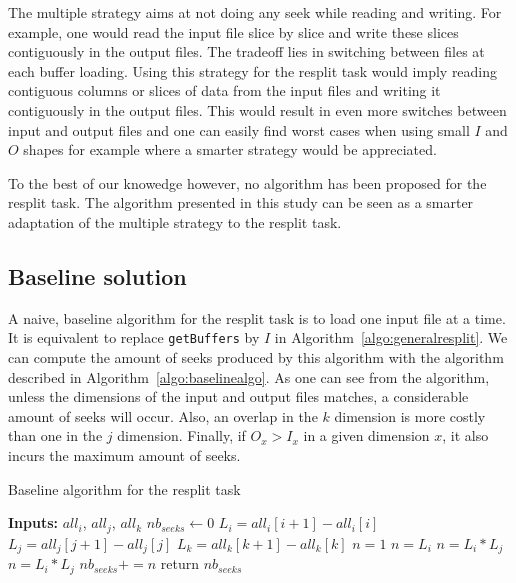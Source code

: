 \documentclass[conference]{IEEEtran}
\begin{document}
The multiple strategy aims at not doing any seek while reading and writing. For
example, one would read the input file slice by slice and write these slices
contiguously in the output files. The tradeoff lies in switching between files
at each buffer loading. Using this strategy for the resplit task would imply
reading contiguous columns or slices of data from the input files and writing it
contiguously in the output files. This would result in even more switches
between input and output files and one can easily find worst cases when using
small $I$ and $O$ shapes for example where a smarter strategy would be appreciated.

To the best of our knowedge however, no algorithm has been proposed for the
resplit task. The algorithm presented in this study can be seen as a smarter
adaptation of the multiple strategy to the resplit task.

\subsection{Baseline solution}
A naive, baseline algorithm for the resplit task is to load one input file at a
time. It is equivalent to replace \texttt{getBuffers} by $I$ in
Algorithm~\ref{algo:generalresplit}. We can compute the amount of seeks produced
by this algorithm with the algorithm described in Algorithm~\ref{algo:baselinealgo}.
As one can see from the algorithm, unless the dimensions of the input and output
files matches, a considerable amount of seeks will occur. Also, an overlap in the
$k$ dimension is more costly than one in the $j$ dimension. Finally, if
$O_x>I_x$ in a given dimension $x$, it also incurs the maximum amount of seeks.

\begin{algorithm}
  \caption{Baseline algorithm for the resplit task}
  \label{algo:baselinealgo}
  \begin{algorithmic}
    \STATE \textbf{Inputs:} $all_i$, $all_j$, $all_k$
    \STATE $nb_{seeks} \leftarrow 0$
          \STATE $L_i = all_i[i+1] - all_i[i]$
          \STATE $L_j = all_j[j+1] - all_j[j]$
          \STATE $L_k = all_k[k+1] - all_k[k]$
                \STATE $n = 1$
              \ELSE
                \STATE $n = L_i$
              \ENDIF
            \ELSE
              \STATE $n = L_i*L_j$
            \ENDIF
          \ELSE
            \STATE $n = L_i*L_j$
          \ENDIF
          \STATE $nb_{seeks} += n$
        \ENDFOR
      \ENDFOR
    \ENDFOR
    \STATE return $nb_{seeks}$
  \end{algorithmic}
\end{algorithm}
\end{document}

